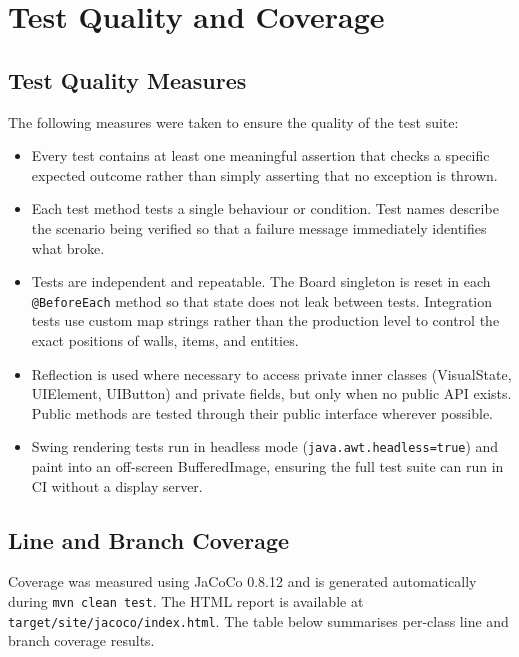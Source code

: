\documentclass[12pt]{article}
\begin{document}
\section{Test Quality and Coverage}

\subsection{Test Quality Measures}

The following measures were taken to ensure the quality of the test suite:

\begin{itemize}

\item Every test contains at least one meaningful assertion that checks a specific expected outcome rather than simply asserting that no exception is thrown.

\item Each test method tests a single behaviour or condition. Test names describe the scenario being verified so that a failure message immediately identifies what broke.

\item Tests are independent and repeatable. The Board singleton is reset in each \texttt{@BeforeEach} method so that state does not leak between tests. Integration tests use custom map strings rather than the production level to control the exact positions of walls, items, and entities.

\item Reflection is used where necessary to access private inner classes (VisualState, UIElement, UIButton) and private fields, but only when no public API exists. Public methods are tested through their public interface wherever possible.

\item Swing rendering tests run in headless mode (\texttt{java.awt.headless=true}) and paint into an off-screen BufferedImage, ensuring the full test suite can run in CI without a display server.

\end{itemize}

\subsection{Line and Branch Coverage}

Coverage was measured using JaCoCo 0.8.12 and is generated automatically during \texttt{mvn clean test}. The HTML report is available at \texttt{target/site/jacoco/index.html}. The table below summarises per-class line and branch coverage results.
\end{document}
